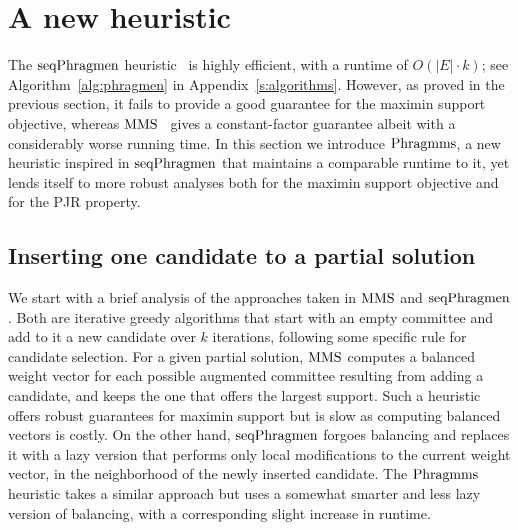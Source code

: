 \section{A new heuristic}\label{s:heuristic}

The $\operatorname{seqPhragmen}$ heuristic~\cite{brill2017phragmen} is highly efficient, with a runtime of $O(|E|\cdot k)$; see Algorithm~\ref{alg:phragmen} in Appendix~\ref{s:algorithms}. 
However, as proved in the previous section, it fails to provide a good guarantee for the maximin support objective, whereas $\operatorname{MMS}$~\cite{sanchez2016maximin} gives a constant-factor guarantee albeit with a considerably worse running time.
In this section we introduce $\operatorname{Phragmms}$, a new heuristic inspired in $\operatorname{seqPhragmen}$ that maintains a comparable runtime to it, yet lends itself to more robust analyses both for the maximin support objective and for the PJR property. 

\subsection{Inserting one candidate to a partial solution}\label{s:inserting}

We start with a brief analysis of the approaches taken in $\operatorname{MMS}$ and $\operatorname{seqPhragmen}$. 
Both are iterative greedy algorithms that start with an empty committee and add to it a new candidate over $k$ iterations, following some specific rule for candidate selection.
For a given partial solution, $\operatorname{MMS}$ computes a balanced weight vector for each possible augmented committee resulting from adding a candidate, and keeps the one that offers the largest support. 
Such a heuristic offers robust guarantees for maximin support but is slow as computing balanced vectors is costly. 
On the other hand, $\operatorname{seqPhragmen}$ forgoes balancing and replaces it with a lazy version that performs only local modifications to the current weight vector, in the neighborhood of the newly inserted candidate. 
The $\operatorname{Phragmms}$ heuristic takes a similar approach but uses a somewhat smarter and less lazy version of balancing, with a corresponding slight increase in runtime. 

